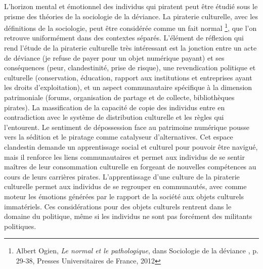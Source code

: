 L'horizon mental et émotionnel des individus qui piratent peut être étudié sous le prisme des théories de la sociologie de la déviance. La piraterie culturelle, avec les définitions de la sociologie, peut être considérée comme un fait normal \footnote{Albert Ogien, \textit{Le normal et le pathologique}, dans \og Sociologie de la déviance \fg, p. 29-38, Presses Universitaires de France, 2012}, que l'on retrouve uniformément dans des contextes séparés. L'élément de réflexion qui rend l'étude de la piraterie culturelle très intéressant est la jonction entre un acte de déviance (je refuse de payer pour un objet numérique payant) et ses conséquences (peur, clandestinité, prise de risque), une revendication politique et culturelle (conservation, éducation, rapport aux institutions et entreprises ayant les droits d'exploitation), et un aspect communautaire spécifique à la dimension patrimoniale (forums, organisation de partage et de collecte, bibliothèques pirates). La massification de la capacité de copie des individus entre en contradiction avec le système de distribution culturelle et les règles qui l'entourent. Le sentiment de dépossession face au patrimoine numérique pousse vers la sédition et le piratage comme catalyseur d'alternatives. Cet espace clandestin demande un apprentissage social et culturel pour pouvoir être navigué, mais il renforce les liens communautaires et permet aux individus de se sentir maîtres de leur consommation culturelle en forgeant de nouvelles compétences au cours de leurs carrières pirates. L'apprentissage d'une culture de la piraterie culturelle permet aux individus de se regrouper en communautés, avec comme moteur les émotions générées par le rapport de la société aux objets culturels immatériels. Ces considérations pour des objets culturels rentrent dans le domaine du politique, même si les individus ne sont pas forcément des militants politiques. 

